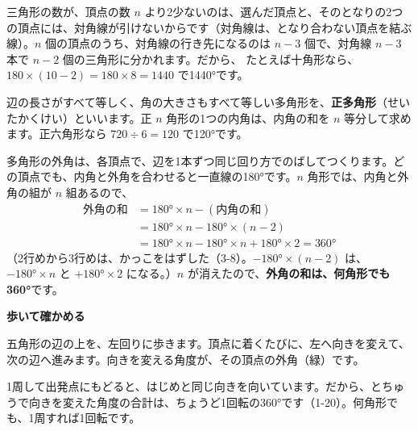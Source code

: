 三角形の数が、頂点の数 $n$ より2少ないのは、選んだ頂点と、そのとなりの2つの頂点には、対角線が引けないからです（対角線は、となり合わない頂点を結ぶ線）。$n$ 個の頂点のうち、対角線の行き先になるのは $n-3$ 個で、対角線 $n-3$ 本で $n-2$ 個の三角形に分かれます。だから、
たとえば十角形なら、$180\times(10-2)=180\times8=1440$ で1440°です。

辺の長さがすべて等しく、角の大きさもすべて等しい多角形を、\textbf{正多角形}（せいたかくけい）といいます。正 $n$ 角形の1つの内角は、内角の和を $n$ 等分して求めます。正六角形なら $720\div6=120$ で120°です。

多角形の外角は、各頂点で、辺を1本ずつ同じ回り方でのばしてつくります。どの頂点でも、内角と外角を合わせると一直線の180°です。$n$ 角形では、内角と外角の組が $n$ 組あるので、
\begin{align*}
\text{外角の和}&=180°\times n-(\text{内角の和})\\
&=180°\times n-180°\times(n-2)\\
&=180°\times n-180°\times n+180°\times2=360°
\end{align*}
（2行めから3行めは、かっこをはずした（3-8）。$-180°\times(n-2)$ は、$-180°\times n$ と $+180°\times2$ になる。）$n$ が消えたので、\textbf{外角の和は、何角形でも360°}です。

\par\addvspace{4pt}\noindent\begin{minipage}[c]{0.44\linewidth}\centering
{}
\end{minipage}\hfill
\begin{minipage}[c]{0.53\linewidth}
\textbf{歩いて確かめる}\par
五角形の辺の上を、左回りに歩きます。頂点に着くたびに、左へ向きを変えて、次の辺へ進みます。向きを変える角度が、その頂点の外角（緑）です。

1周して出発点にもどると、はじめと同じ向きを向いています。だから、とちゅうで向きを変えた角度の合計は、ちょうど1回転の360°です（1-20）。何角形でも、1周すれば1回転です。
\end{minipage}


